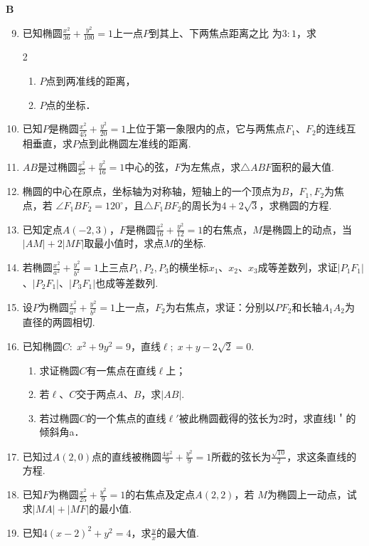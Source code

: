 \begin{center}
    \bfseries B
\end{center}

\begin{enumerate}\setcounter{enumi}{8}
    \item 已知椭圆$\frac{x^2}{36}+\frac{y^2}{100}=1$上一点$P$到其上、下两焦点距离之比
为$3:1$，求
\begin{multicols}{2}
\begin{enumerate}[(1)]
    \item $P$点到两准线的距离，
    \item $P$点的坐标．
\end{enumerate}    
\end{multicols}

\item 已知$P$是椭圆$\frac{x^2}{45}+\frac{y^2}{20}=1$上位于第一象限内的点，它与两焦点$F_1$、$F_2$的连线互相垂直，求$P$点到此椭圆左准线的距离.
\item $AB$是过椭圆$\frac{x^2}{25}+\frac{y^2}{16}=1$中心的弦，$F$为左焦点，求$\triangle ABF$面积的最大值.
\item 椭圆的中心在原点，坐标轴为对称轴，短轴上的一个顶点为$B$，$F_1, F_2$为焦点，若
$\angle F_1BF_2=120^{\circ}$，且$\triangle F_1BF_2$的周长为$4+2\sqrt{3}$，求椭圆的方程.
\item 已知定点$A(-2,3)$，$F$是椭圆$\frac{x^2}{16}+\frac{y^2}{12}=1$的右焦点，$M$是椭圆上的动点，当$|AM|+2|MF|$取最小值时，求点$M$的坐标.
\item 若椭圆$\frac{x^2}{a^2}+\frac{y^2}{b^2}=1$上三点$P_1,P_2,P_3$的横坐标$x_1$、$x_2$、$x_3$成等差数列，求证$|P_1F_1|$、$|P_2F_1|$、$|P_3F_1|$也成等差数列.
\item 设$P$为椭圆$\frac{x^2}{a^2}+\frac{y^2}{b^2}=1$上一点，$F_2$为右焦点，求证：分别以$PF_2$和长轴$A_1A_2$为直径的两圆相切.
\item 已知椭圆$C:\; x^2+9y^2=9$，直线$\ell;\; x+y-2\sqrt{2}=0$.
\begin{enumerate}[(1)]
\item 求证椭圆$C$有一焦点在直线$\ell$上；
\item 若$\ell$、$C$交于两点$A$、$B$，求$|AB|$.
\item 若过椭圆$C$的一个焦点的直线$\ell'$被此椭圆截得的弦长为2时，求直线l＇的倾斜角a．
\end{enumerate}

\item 已知过$A(2,0)$点的直线被椭圆$\frac{4x^2}{9}+\frac{y^2}{9}=1$所截的弦长为$\frac{\sqrt{10}}{2}$，求这条直线的方程.
\item 已知$F$为椭圆$\frac{x^2}{25}+\frac{y^2}{9}=1$的右焦点及定点$A(2,2)$，若
$M$为椭圆上一动点，试求$|MA|+|MF|$的最小值.
\item 已知$4(x-2)^2+y^2=4$，求$\frac{y}{x}$的最大值.
\end{enumerate}

